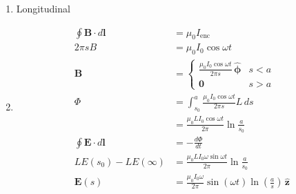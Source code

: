 \documentclass{article}
\renewcommand{\vec}[1]{\boldsymbol{\mathbf{#1}}}
\newcommand{\uvec}[1]{\hat{\vec{#1}}}
\begin{document}
\begin{enumerate}
  \item Longitudinal

  \item

        \begin{align*}
          \oint \vec{B} \cdot d \vec{l} & = \mu_0 I_\text{enc}                                                                       \\
          2 \pi s B                     & = \mu_0 I_0 \cos \omega t                                                                  \\
          \vec{B}                       & = \begin{cases}
                                              \frac{\mu_0 I_0 \cos \omega t}{2 \pi s} \,\uvec{\phi} & s < a \\
                                              \vec{0}                                               & s > a
                                            \end{cases}                            \\
          \Phi                          & = \int_{s_0}^a \frac{\mu_0 I_0 \cos \omega t}{2 \pi s} L \,d s                             \\
                                        & = \frac{\mu_0 L I_0 \cos \omega t}{2 \pi} \ln \frac{a}{s_0}                                \\
          \oint \vec{E} \cdot d \vec{l} & = -\frac{d \Phi}{d t}                                                                      \\
          L E(s_0) - L E(\infty)        & = \frac{\mu_0 L I_0 \omega \sin \omega t}{2 \pi} \ln \frac{a}{s_0}                         \\
          \vec{E}(s)                    & = \frac{\mu_0 I_0 \omega}{2 \pi} \sin (\omega t) \ln \left( \frac{a}{s} \right) \,\uvec{z}
        \end{align*}
\end{enumerate}

\subsection{}
\end{document}
